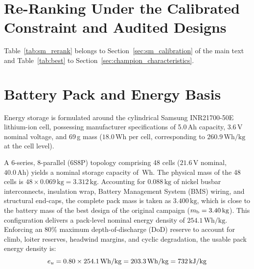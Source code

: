 \section{Re-Ranking Under the Calibrated Constraint and Audited Designs}
\label{sec:supp_rerank}
Table~\ref{tab:sm_rerank} belongs to Section~\ref{sec:sm_calibration} of the main text and Table~\ref{tab:best} to Section~\ref{sec:champion_characteristics}.

\begin{table}[htbp]
\centering\small
\caption{Best-of-run range with the original lattice margin constraint and after applying the CFD calibration of the margin, by search strategy (corrected implementations). The last column counts runs whose best design lies outside the calibrated band $0.05 \le SM \le 0.25$.}
\label{tab:sm_rerank}
\resizebox{\linewidth}{!}{%

}
\end{table}

\begin{table}[htbp]
\centering\small
\caption{Characteristics of the best design of the original campaign and of the best design of active-learning replication 0.}
\label{tab:best}

\end{table}


\section{Battery Pack and Energy Basis}
\label{sec:battery_pack}
Energy storage is formulated around the cylindrical Samsung INR21700-50E lithium-ion cell, possessing manufacturer specifications of 5.0\,Ah capacity, 3.6\,V nominal voltage, and 69\,g mass ($18.0$\,Wh per cell, corresponding to $260.9\,\mathrm{Wh/kg}$ at the cell level). 

A 6-series, 8-parallel (6S8P) topology comprising 48 cells ($21.6\,\mathrm{V}$ nominal, $40.0\,\mathrm{Ah}$) yields a nominal storage capacity of \NpackNom\,Wh. The physical mass of the 48 cells is $48 \times 0.069\,\mathrm{kg} = 3.312\,\mathrm{kg}$. Accounting for $0.088\,\mathrm{kg}$ of nickel busbar interconnects, insulation wrap, Battery Management System (BMS) wiring, and structural end-caps, the complete pack mass is taken as $3.400\,\mathrm{kg}$, which is close to the battery mass of the best design of the original campaign ($m_{\mathrm{b}} = 3.40\,\mathrm{kg}$). This configuration delivers a pack-level nominal energy density of $254.1\,\mathrm{Wh/kg}$. Enforcing an 80\% maximum depth-of-discharge (DoD) reserve to account for climb, loiter reserves, headwind margins, and cyclic degradation, the usable pack energy density is:
\begin{equation}
e_u = 0.80 \times 254.1\,\mathrm{Wh/kg} = 203.3\,\mathrm{Wh/kg} = 732\,\mathrm{kJ/kg}
\end{equation}

